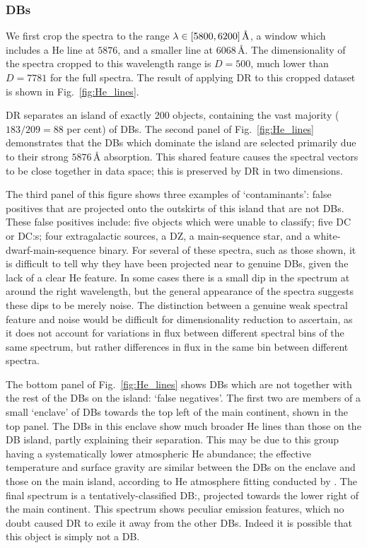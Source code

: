 \documentclass[fleqn,usenatbib]{mnras}
\begin{document}
\subsubsection{DBs}
\label{sec:DBs}

We first crop the spectra to the range $\lambda \in \qty[5800, 6200]\,\text{\AA}$, a window which includes a He line at $5876$, and a smaller line at $6068\,\text{\AA}$.
The dimensionality of the spectra cropped to this wavelength range is $D=500$, much lower than $D=7781$ for the full spectra.
The result of applying DR to this cropped dataset is shown in Fig.~\ref{fig:He_lines}.

DR separates an island of exactly 200 objects, containing the vast majority ($183/209=88$ per cent) of DBs.
The second panel of Fig.~\ref{fig:He_lines} demonstrates that the DBs which dominate the island are selected primarily due to their strong $5876\,\text{\AA}$ absorption.
This shared feature causes the spectral vectors to be close together in data space; this is preserved by DR in two dimensions.

The third panel of this figure shows three examples of `contaminants': false positives that are projected onto the outskirts of this island that are not DBs.
These false positives include: five objects which \citet{manser24} were unable to classify; five DC or DC:s; four extragalactic sources, a DZ, a main-sequence star, and a white-dwarf-main-sequence binary.
For several of these spectra, such as those shown, it is difficult to tell why they have been projected near to genuine DBs, given the lack of a clear He feature.
In some cases there is a small dip in the spectrum at around the right wavelength, but the general appearance of the spectra suggests these dips to be merely noise.
The distinction between a genuine weak spectral feature and noise would be difficult for dimensionality reduction to ascertain, as it does not account for variations in flux between different spectral bins of the same spectrum, but rather differences in flux in the same bin between different spectra.

The bottom panel of Fig.~\ref{fig:He_lines} shows DBs which are not together with the rest of the DBs on the island: `false negatives'.
The first two are members of a small `enclave' of DBs towards the top left of the main continent, shown in the top panel.
The DBs in this enclave show much broader He lines than those on the DB island, partly explaining their separation.
This may be due to this group having a systematically lower atmospheric He abundance; the effective temperature and surface gravity are similar between the DBs on the enclave and those on the main island, according to He atmosphere fitting conducted by \citet{gentilefusillo19}.
The final spectrum is a tentatively-classified DB:, projected towards the lower right of the main continent.
This spectrum shows peculiar emission features, which no doubt caused DR to exile it away from the other DBs.
Indeed it is possible that this object is simply not a DB.
\end{document}
